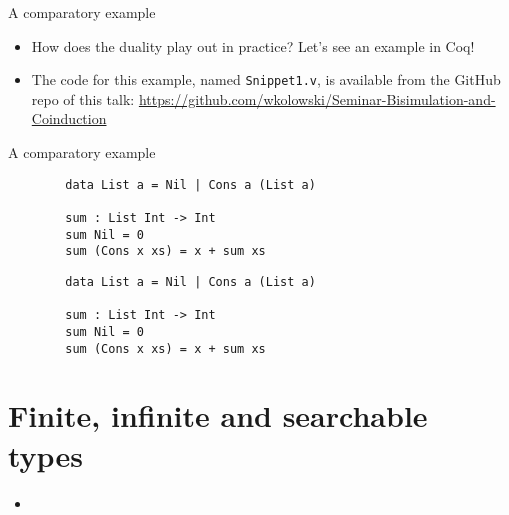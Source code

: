 \documentclass{beamer}
\begin{document}
\begin{frame}{A comparatory example}
\begin{itemize}
	\item How does the duality play out in practice? Let's see an example in Coq!
	\item The code for this example, named \texttt{Snippet1.v}, is available from the GitHub repo of this talk: \url{https://github.com/wkolowski/Seminar-Bisimulation-and-Coinduction}
\end{itemize}
\end{frame}

\begin{frame}[fragile]{A comparatory example}
\noindent
\begin{minipage}[l]{0.45\linewidth}
	\begin{verbatim}
		data List a = Nil | Cons a (List a)

		sum : List Int -> Int
		sum Nil = 0
		sum (Cons x xs) = x + sum xs
	\end{verbatim}
\end{minipage}
\noindent
\begin{minipage}[b]{0.45\linewidth}
	\begin{verbatim}
		data List a = Nil | Cons a (List a)

		sum : List Int -> Int
		sum Nil = 0
		sum (Cons x xs) = x + sum xs
	\end{verbatim}
\end{minipage}
\end{frame}




\section{Finite, infinite and searchable types}

\begin{frame}{}
\begin{itemize}
	\item 
\end{itemize}
\end{frame}
\end{document}
